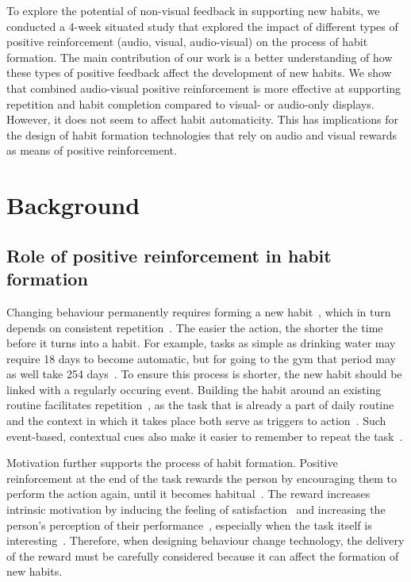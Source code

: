 \documentclass{scaffold/sigchi}
\begin{document}
To explore the potential of non-visual feedback in supporting new habits, we conducted a 4-week situated study that explored the impact of different types of positive reinforcement (audio, visual, audio-visual) on the process of habit formation.
The main contribution of our work is a better understanding of how these types of positive feedback affect the development of new habits. We show that combined audio-visual positive reinforcement is more effective at supporting repetition and habit completion compared to visual- or audio-only displays. However, it does not seem to affect habit automaticity.
%
This has implications for the design of habit formation technologies that rely on audio and visual rewards as means of positive reinforcement.

\section{Background}
\subsection{Role of positive reinforcement in habit formation}
Changing behaviour permanently requires forming a new habit~\cite{article_experiences_of_habit_formation}, which in turn depends on consistent repetition~\cite{article_how_habits_formed_modelling_habit_formation}. The easier the action, the shorter the time before it turns into a habit. For example, tasks as simple as drinking water may require 18 days to become automatic, but for going to the gym that period may as well take 254 days~\cite{article_how_habits_formed_modelling_habit_formation}. To ensure this process is shorter, the new habit should be linked with a regularly occuring event. Building the habit around an existing routine facilitates repetition~\cite{habits_event_cues_1}, as the task that is already a part of daily routine and the context in which it takes place both serve as  triggers to action~\cite{habits_event_cues_2}. Such event-based, contextual cues also make it easier to remember to repeat the task~\cite{article_implementation_intentions_multicue, article_implementation_intentions}.

Motivation further supports the process of habit formation. Positive reinforcement at the end of the task rewards the person by encouraging them to perform the action again, until it becomes habitual~\cite{article_a_self_efficacy}. The reward increases intrinsic motivation by inducing the feeling of satisfaction~\cite{article_promoting_habit_formation} and increasing the person's perception of their performance~\cite{positive_reinforcement_pro}, especially when the task itself is interesting~\cite{article_meta_analytic_review_intrinsic_motivation}. Therefore, when designing behaviour change technology, the delivery of the reward must be carefully considered because it can affect the formation of new habits.
\end{document}
